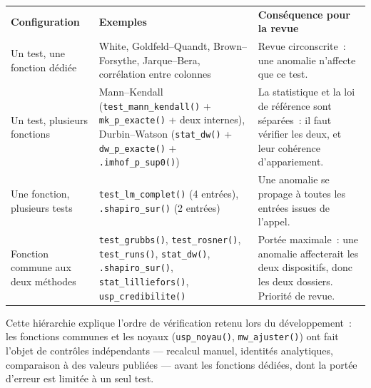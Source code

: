 \documentclass[a4paper,11pt]{article}
\newcommand{\code}[1]{\texttt{\small #1}}
\begin{document}
\begin{center}
\small
{}
\begin{tabular}{@{}p{4.4cm}p{3.0cm}p{7.6cm}@{}}
\rowcolor{tableheader}
\textcolor{financeblue}{\textbf{Configuration}} &
\textcolor{financeblue}{\textbf{Exemples}} &
\textcolor{financeblue}{\textbf{Conséquence pour la revue}} \\
Un test, une fonction dédiée & White, Goldfeld--Quandt, Brown--Forsythe,
Jarque--Bera, corrélation entre colonnes & Revue circonscrite~: une anomalie
n'affecte que ce test. \\
Un test, plusieurs fonctions & Mann--Kendall (\code{test\_mann\_kendall()} +
\code{mk\_p\_exacte()} + deux internes), Durbin--Watson (\code{stat\_dw()} +
\code{dw\_p\_exacte()} + \code{.imhof\_p\_sup0()}) & La statistique et la loi de
référence sont séparées~: il faut vérifier les deux, et leur cohérence
d'appariement. \\
Une fonction, plusieurs tests & \code{test\_lm\_complet()} (4 entrées),
\code{.shapiro\_sur()} (2 entrées) & Une anomalie se propage à toutes les
entrées issues de l'appel. \\
Fonction commune aux deux méthodes & \code{test\_grubbs()},
\code{test\_rosner()}, \code{test\_runs()}, \code{stat\_dw()},
\code{.shapiro\_sur()}, \code{stat\_lilliefors()}, \code{usp\_credibilite()} &
Portée maximale~: une anomalie affecterait les deux dispositifs, donc les deux
dossiers. Priorité de revue. \\
\end{tabular}
\end{center}

\noindent
Cette hiérarchie explique l'ordre de vérification retenu lors du développement~:
les fonctions communes et les noyaux (\code{usp\_noyau()}, \code{mw\_ajuster()})
ont fait l'objet de contrôles indépendants --- recalcul manuel, identités
analytiques, comparaison à des valeurs publiées --- avant les fonctions dédiées,
dont la portée d'erreur est limitée à un seul test.
\end{document}
